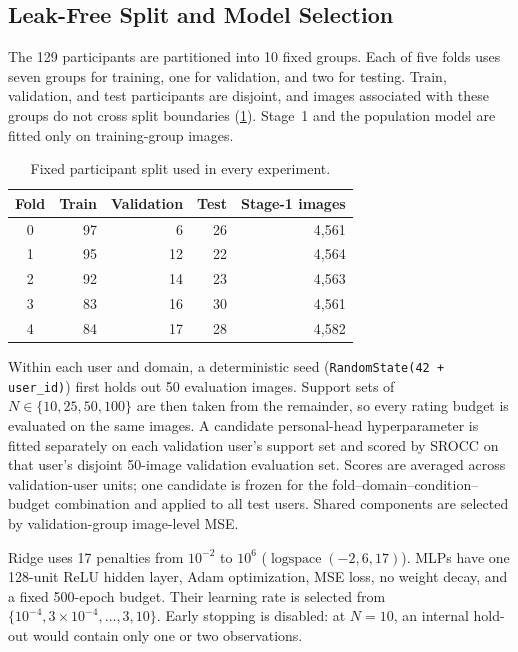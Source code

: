 \documentclass[10pt,twocolumn,letterpaper]{article}
\begin{document}
\subsection{Leak-Free Split and Model Selection}
The 129 participants are partitioned into 10 fixed groups. Each of five folds
uses seven groups for training, one for validation, and two for testing. Train,
validation, and test participants are disjoint, and images associated with
these groups do not cross split boundaries (\cref{tab:fold_counts}). Stage~1
and the population model are fitted only on training-group images.


\begin{table}[t]
\centering
\small
\caption{Fixed participant split used in every experiment.}
\label{tab:fold_counts}
\begin{tabular}{crrrr}
\toprule
Fold & Train & Validation & Test & Stage-1 images \\
\midrule
0 & 97 &  6 & 26 & 4{,}561 \\
1 & 95 & 12 & 22 & 4{,}564 \\
2 & 92 & 14 & 23 & 4{,}563 \\
3 & 83 & 16 & 30 & 4{,}561 \\
4 & 84 & 17 & 28 & 4{,}582 \\
\bottomrule
\end{tabular}
\end{table}

Within each user and domain, a deterministic seed (\texttt{RandomState(42 + user\_id)})
first holds out 50 evaluation images. Support sets of $N\in\{10,25,50,100\}$ are then taken from the remainder, so every rating budget is evaluated on the same images. A candidate personal-head hyperparameter is fitted separately on each validation user's support set and scored by SROCC on that user's disjoint 50-image validation evaluation set.
Scores are averaged across validation-user units; one candidate is frozen for the fold--domain--condition--budget combination and applied to all test users.
Shared components are selected by validation-group image-level MSE.

Ridge uses 17 penalties from $10^{-2}$ to $10^{6}$
($\operatorname{logspace}(-2,6,17)$). MLPs have one 128-unit ReLU hidden layer,
Adam optimization, MSE loss, no weight decay, and a fixed 500-epoch budget.
Their learning rate is selected from
$\{10^{-4},3\!\times\!10^{-4},\ldots,3,10\}$. Early stopping is disabled:
at $N=10$, an internal hold-out would contain only one or two observations.
\end{document}
